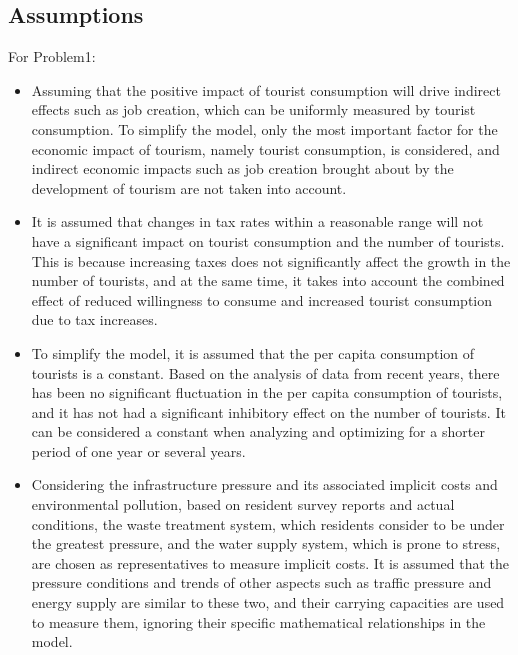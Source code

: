 \documentclass[12pt]{article}  %
\begin{document}
\subsection{Assumptions}
For Problem1:
\begin{itemize}
	\item Assuming that the positive impact of tourist consumption will drive indirect effects such as job creation, which can be uniformly measured by tourist consumption. To simplify the model, only the most important factor for the economic impact of tourism, namely tourist consumption, is considered, and indirect economic impacts such as job creation brought about by the development of tourism are not taken into account.
	\item It is assumed that changes in tax rates within a reasonable range will not have a significant impact on tourist consumption and the number of tourists. This is because increasing taxes does not significantly affect the growth in the number of tourists, and at the same time, it takes into account the combined effect of reduced willingness to consume and increased tourist consumption due to tax increases.
	\item To simplify the model, it is assumed that the per capita consumption of tourists is a constant. Based on the analysis of data from recent years, there has been no significant fluctuation in the per capita consumption of tourists, and it has not had a significant inhibitory effect on the number of tourists. It can be considered a constant when analyzing and optimizing for a shorter period of one year or several years.
	\item Considering the infrastructure pressure and its associated implicit costs and environmental pollution, based on resident survey reports and actual conditions, the waste treatment system, which residents consider to be under the greatest pressure, and the water supply system, which is prone to stress, are chosen as representatives to measure implicit costs. It is assumed that the pressure conditions and trends of other aspects such as traffic pressure and energy supply are similar to these two, and their carrying capacities are used to measure them, ignoring their specific mathematical relationships in the model.

\end{itemize}
\end{document}
